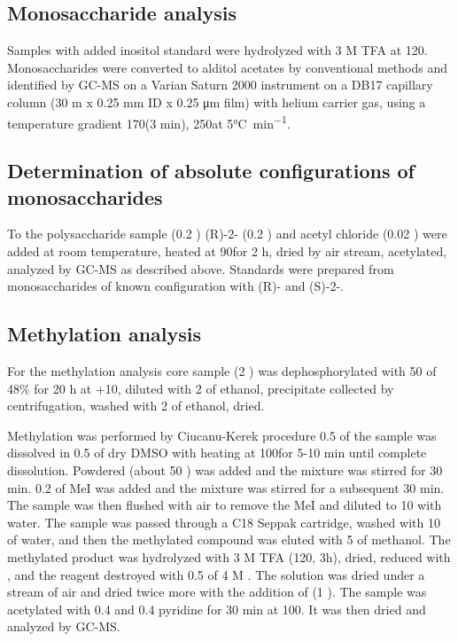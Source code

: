 	\subsection{Monosaccharide analysis} %
	\label{sub:monosaccharide_analysis}

		Samples with added inositol standard were hydrolyzed with 3 M \ac{TFA} at 120\cel. Monosaccharides were converted to alditol acetates by conventional methods and identified by \ac{GC-MS} on a Varian Saturn 2000 instrument on a DB17 capillary column (30 m x 0.25 \si{\milli\meter} ID x 0.25 \si{\micro\meter} film) with helium carrier gas, using a temperature gradient 170\cel (3 min), 250\cel at 5\si{\degreeCelsius\per\minute}.

	\subsection{Determination of absolute configurations of monosaccharides} %
	\label{sub:determination_of_absolute_configurations_of_monosaccharides}

		To the polysaccharide sample (0.2 \milligram) (R)-2- (0.2 \millilitre) and acetyl chloride (0.02 \millilitre) were added at room temperature, heated at 90\cel for 2 h, dried by air stream, acetylated, analyzed by \ac{GC-MS} as described above. Standards were prepared from monosaccharides of known configuration with (R)- and (S)-2-.

	\subsection{Methylation analysis} %
	\label{sub:methylation_analysis}

		For the methylation analysis core sample (2 \milligram) was dephosphorylated with 50 \microlitre of 48\%  for 20 h at +10\cel, diluted with 2 \millilitre of ethanol, precipitate collected by centrifugation, washed with 2 \millilitre of ethanol, dried.

		Methylation was performed by Ciucanu-Kerek procedure 0.5 \milligram of the sample was dissolved in 0.5 \millilitre of dry DMSO with heating at 100\cel for 5-10 min until complete dissolution. Powdered  (about 50 \milligram) was added and the mixture was stirred for 30 min. 0.2 \millilitre of MeI was added and the mixture was stirred for a subsequent 30 min. The sample was then flushed with air to remove the MeI and diluted to 10 \millilitre with water. The sample was passed through a C18 Seppak cartridge, washed with 10 \millilitre of water, and then the methylated compound was eluted with 5 \millilitre of methanol. The methylated product was hydrolyzed with 3 M TFA (120\cel, 3h), dried, reduced with , and the reagent destroyed with 0.5 \millilitre of 4 M . The solution was dried under a stream of air and dried twice more with the addition of  (1 \millilitre). The sample was acetylated with 0.4 \millilitre{}  and 0.4 \millilitre pyridine for 30 min at 100\cel. It was then dried and analyzed by \ac{GC-MS}.

